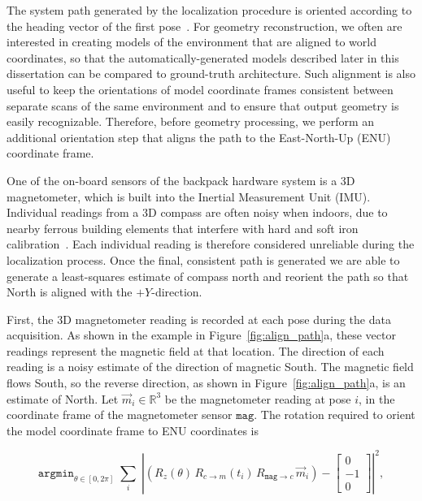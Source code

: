 \documentclass[12pt,onecolumn,oneside]{book}
\begin{document}
The system path generated by the localization procedure is oriented according to the heading vector of the first pose~\cite{Localization,NickJournal}.  For geometry reconstruction, we often are interested in creating models of the environment that are aligned to world coordinates, so that the automatically-generated models described later in this dissertation can be compared to ground-truth architecture.  Such alignment is also useful to keep the orientations of model coordinate frames consistent between separate scans of the same environment and to ensure that output geometry is easily recognizable.  Therefore, before geometry processing, we perform an additional orientation step that aligns the path to the East-North-Up (ENU) coordinate frame.

One of the on-board sensors of the backpack hardware system is a 3D magnetometer, which is built into the Inertial Measurement Unit (IMU).  Individual readings from a 3D compass are often noisy when indoors, due to nearby ferrous building elements that interfere with hard and soft iron calibration~\cite{Caruso00,Guo08}.  Each individual reading is therefore considered unreliable during the localization process.  Once the final, consistent path is generated we are able to generate a least-squares estimate of compass north and reorient the path so that North is aligned with the $+Y$-direction.

First, the 3D magnetometer reading is recorded at each pose during the data acquisition.  As shown in the example in Figure~\ref{fig:align_path}a, these vector readings represent the magnetic field at that location.  The direction of each reading is a noisy estimate of the direction of magnetic South.  The magnetic field flows South, so the reverse direction, as shown in Figure~\ref{fig:align_path}a, is an estimate of North.  Let $\vec{m}_i \in \mathbb{R}^3$ be the magnetometer reading at pose $i$, in the coordinate frame of the magnetometer sensor $\texttt{mag}$.  The rotation required to orient the model coordinate frame to ENU coordinates is

\begin{equation}
	\label{eq:align_path}
	\texttt{argmin}_{\theta \in [0,2\pi]} \; \sum \limits_{i} 
		\; \left| \left( R_{z}(\theta) \, R_{c\rightarrow m} (t_i) \,
			R_{\texttt{mag} \rightarrow c} \, \vec{m}_i \right) - \left[ 
				\begin{array}{c} 0 \\ -1 \\ 0 \end{array} 
					\right] \right|^2,
\end{equation}
\end{document}
